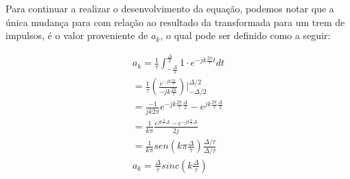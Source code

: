Para continuar a realizar o desenvolvimento da equação, podemos notar que a única mudança para com relação ao resultado da transformada para um trem de impulsos, é o valor proveniente de $a_k$, o qual pode ser definido como a seguir:

\begin{align}
    a_k = \frac{1}{\tau} \int_{-\frac{\Delta}{2}}^{\frac{\Delta}{2}} 1 \cdot e^{-jk \frac{2\pi}{\tau}t}dt \\
    = \frac{1}{\tau} (\frac{e^{-jk\frac{2\pi}{\tau}}}{-jk\frac{2\pi}{\tau}}) \bigg\rvert_{-\Delta/2}^{\Delta/2} \\
    = \frac{-1}{jk2\pi} e^{-jk\frac{2\pi}{\tau}\frac{\Delta}{2}} - e^{jk\frac{2\pi}{\tau}\frac{\Delta}{2}} \\
    = \frac{1}{k\pi}\frac{e^{jk\frac{\pi}{\tau}\Delta}-e^{-jk\frac{\pi}{\tau}\Delta}}{2j} \\
    = \frac{1}{k\pi} sen(k\pi\frac{\Delta}{\tau})\frac{\Delta/\tau}{\Delta/\tau} \\
    a_{k} = \frac{\Delta}{\tau} sinc(k\frac{\Delta}{\tau})
\end{align}
